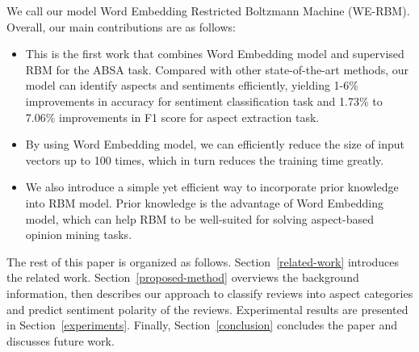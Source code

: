 We call our model Word Embedding Restricted Boltzmann Machine (WE-RBM).
Overall, our main contributions are as follows:
\begin{itemize}
\item This is the first work that combines Word Embedding model and supervised RBM for the ABSA task. Compared with other state-of-the-art methods, our model can identify aspects and sentiments efficiently, yielding 1-6\% improvements in accuracy for sentiment classification task and 1.73\% to 7.06\% improvements in F1 score for aspect extraction task.
\item By using Word Embedding model, we can efficiently reduce the size of input vectors up to 100 times, which in turn reduces the training time greatly.
\item We also introduce a simple yet efficient way to incorporate prior knowledge into RBM model. Prior knowledge is the advantage of Word Embedding model, which can help RBM to be well-suited for solving aspect-based opinion mining tasks.
\end{itemize}

The rest of this paper is organized as follows.
Section~\ref{related-work} introduces the related work.
Section~\ref{proposed-method} overviews the background information, then describes our approach to classify reviews into aspect categories and predict sentiment polarity of the reviews.
Experimental results are presented in Section~\ref{experiments}.
Finally, Section~\ref{conclusion} concludes the paper and discusses future work.




